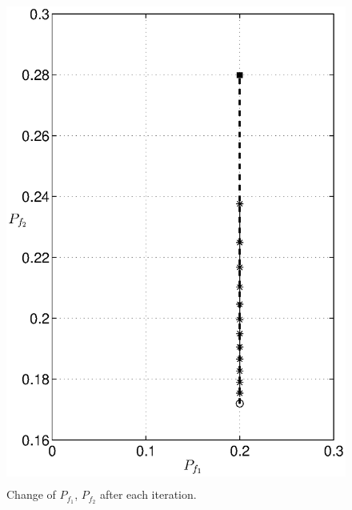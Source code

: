 \begin{figure}[H]
\centering
\includegraphics[width = 12cm , height = 16cm]{2/24pf.eps}
\caption{Change of $P_{f_1}$, $P_{f_2}$ after each iteration.}
\label{fig: 2.4}
\end{figure}
\newpage

